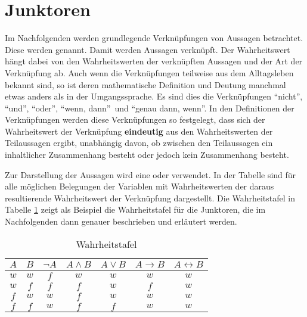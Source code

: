 \section{Junktoren}
\label{sec:ElemLogik-Junktoren}

\begin{Unit}[Anmerkung]
Im Nachfolgenden werden grundlegende Verknüpfungen von Aussagen betrachtet. 
Diese werden  genannt. Damit werden Aussagen verknüpft. 
Der Wahrheitswert hängt dabei von den Wahrheitswerten der verknüpften 
Aussagen und der Art der Verknüpfung ab. Auch wenn die Verknüpfungen 
teilweise aus dem Alltagsleben bekannt sind, so ist deren mathematische 
Definition und Deutung manchmal etwas anders als in der Umgangssprache. Es 
sind dies die Verknüpfungen \enquote{nicht}, \enquote{und}, \enquote{oder},
\enquote{wenn, dann}\ und \enquote{genau dann, wenn}. In den Definitionen 
der Verknüpfungen werden diese Verknüpfungen so festgelegt, dass sich der
Wahrheitswert der Verknüpfung \textbf{eindeutig} aus den Wahrheitswerten der
Teilaussagen ergibt, unabhängig davon, ob zwischen den Teilaussagen ein 
inhaltlicher Zusammenhang besteht oder jedoch kein Zusammenhang besteht. 
\end{Unit}

\begin{Unit}

Zur Darstellung der Aussagen wird eine  oder
 verwendet. In der Tabelle sind für alle möglichen
Belegungen der Variablen mit Wahrheitswerten der daraus resultierende 
Wahrheitswert der Verknüpfung dargestellt. Die Wahrheitstafel in Tabelle
\ref{tbl:Beispiel Wahrheitstafel} zeigt als Beispiel die Wahrheitstafel für 
die Junktoren, die im Nachfolgenden dann genauer beschrieben und erläutert 
werden.

\begin{table}[htbp] 
\begin{center}
  \begin{tabular}{c|c||c|c|c|c|c}
    $A$ & $B$ & $\neg A$ & $A \land B$ & $A \lor B$ & $A \rightarrow B$ 
      & $A \leftrightarrow B$\\ \hline
    $w$ & $w$ & $f$ & $w$ & $w$ & $w$ & $w$ \\
    $w$ & $f$ & $f$ & $f$ & $w$ & $f$ & $w$ \\
    $f$ & $w$ & $w$ & $f$ & $w$ & $w$ & $w$ \\
    $f$ & $f$ & $w$ & $f$ & $f$ & $w$ & $w$ \\
  \end{tabular}
  \caption{Wahrheitstafel}
  \label{tbl:Beispiel Wahrheitstafel}
\end{center} 
\end{table}
\end{Unit}

